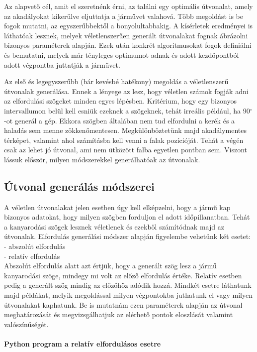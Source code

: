 

Az alapvető cél, amit el szeretnénk érni, az találni egy optimális útvonalat, amely az akadályokat kikerülve eljuttatja a járművet valahová. Több megoldást is be fogok mutatni, az egyszerűbbektől a bonyolultabbakig. A kísérletek eredményei is láthatóak lesznek, melyek véletlenszerűen generált útvonalakat fognak ábrázolni bizonyos paraméterek alapján. Ezek után konkrét algoritmusokat fogok definiálni és bemutatni, melyek már tényleges optimumot adnak és adott kezdőpontból adott végpontba juttatják a járművet. 



Az első és legegyszerűbb (bár kevésbé hatékony) megoldás a véletlenszerű útvonalak generálása. Ennek a lényege az lesz, hogy véletlen számok fogják adni az elfordulási szögeket minden egyes lépésben. Kritérium, hogy egy bizonyos intervallumon belül kell esniük ezeknek a szögeknek, tehát irreális például, ha 90$^\circ$-ot generál a gép. Ekkora szögben általában nem tud elfordulni a kerék és a haladás sem menne zökkenőmentesen. Megkülönböztetünk majd akadálymentes térképet, valamint ahol számításba kell venni a falak pozícióját. Tehát a végén csak az lehet jó útvonal, ami nem ütközött falba egyetlen pontban sem. Viszont lássuk először, milyen módszerekkel generálhatóak az útvonalak.\\ 

\subsection{Útvonal generálás módszerei}

A véletlen útvonalakat jelen esetben úgy kell elképzelni, hogy a jármű kap bizonyos adatokat, hogy milyen szögben forduljon el adott időpillanatban. Tehát a kanyarodási szögek lesznek véletlenek és ezekből számítódnak majd az útvonalak. Elfordulás generálási módszer alapján figyelembe vehetünk két esetet:\\
\phantom{len}- abszolút elfordulás\\ 
\phantom{len}- relatív elfordulás\\
Abszolút elfordulás alatt azt értjük, hogy a generált szög lesz a jármű kanyarodási szöge, mindegy mi volt az előző elfordulás értéke. Relatív esetben pedig a generált szög mindig az előzőhöz adódik hozzá. Mindkét esetre láthatunk majd példákat, melyik megoldással milyen végpontokba juthatunk el vagy milyen útvonalakat kaphatunk. Be is mutatnám ezen paraméterek alapján az útvonal meghatározását és megvizsgálhatjuk az elérhető pontok eloszlását valamint valószínűségét.\\\\
\textbf{Python program a relatív elfordulásos esetre}\\


